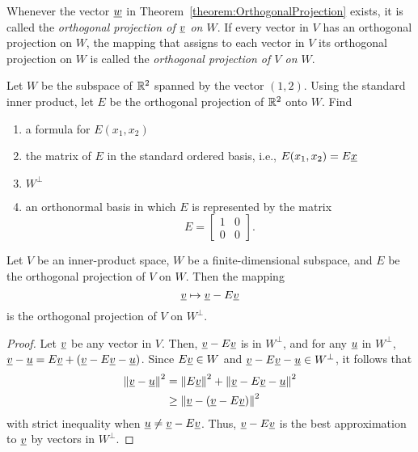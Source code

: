 \begin{definition}
Whenever the vector $\underline{w}$ in Theorem~\ref{theorem:OrthogonalProjection} exists, it is called the \emph{orthogonal projection of $\underline{v}$ on $W$}.
If every vector in $V$ has an orthogonal projection on $W$, the mapping that assigns to each vector in $V$ its orthogonal projection on $W$ is called the \emph{orthogonal projection of $V$ on $W$}.
\end{definition}

\begin{problem}
Let $W$ be the subspace of $\mathbb{R}^2$ spanned by the vector $(1,2)$.
Using the standard inner product, let $E$ be the orthogonal projection of $\mathbb{R}^2$ onto $W$.
Find
\begin{enumerate}
\item a formula for $E(x_1, x_2)$
\item the matrix of $E$ in the standard ordered basis, i.e., $E(x_1, x_2) = E \underline{x}$
\item $W^{\bot}$
\item an orthonormal basis in which $E$ is represented by the matrix
\begin{equation*}
E = \left[ \begin{array}{cc} 1 & 0 \\ 0 & 0 \end{array} \right].
\end{equation*}
\end{enumerate}
\end{problem}

\begin{corollary}
Let $V$ be an inner-product space, $W$ be a finite-dimensional subspace, and $E$ be the orthogonal projection of $V$ on $W$.
Then the mapping
\begin{equation*}
\underline{v} \mapsto \underline{v} - E \underline{v}
\end{equation*}
is the orthogonal projection of $V$ on $W^{\bot}$.
\end{corollary}
\begin{proof}
Let $\underline{v}$ be any vector in $V$.
Then, $\underline{v} - E\underline{v}$ is in $W^{\bot}$, and for any $\underline{u}$ in $W^{\bot}$, $\underline{v} - \underline{u} = E \underline{v} + \left( \underline{v} - E \underline{v} - \underline{u} \right)$.
Since $E \underline{v} \in W$ and $\underline{v} - E \underline{v} - \underline{u} \in W^{\bot}$, it follows that
\begin{equation*}
\begin{split}
\left\| \underline{v} - \underline{u} \right\|^2 &= \left\| E \underline{v} \right\|^2 + \left\| \underline{v} - E \underline{v} - \underline{u} \right\|^2 \\
&\geq \left\| \underline{v} - \left( \underline{v} - E \underline{v} \right) \right\|^2
\end{split}
\end{equation*}
with strict inequality when $\underline{u} \neq \underline{v} - E \underline{v}$.
Thus, $\underline{v} - E \underline{v}$ is the best approximation to $\underline{v}$ by vectors in $W^{\bot}$.
\end{proof}

